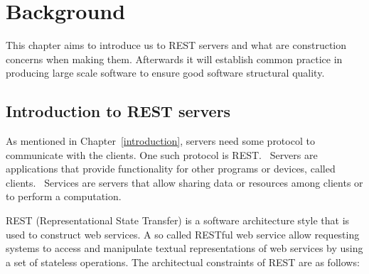 \chapter{Background}\label{background}

This chapter aims to introduce us to REST servers and what are construction
concerns when making them. Afterwards it will establish common practice in
producing large scale software to ensure good software structural quality.

\section{Introduction to REST servers}

As mentioned in Chapter~\ref{introduction}, servers need some protocol to
communicate with the clients. One such protocol is
REST.~\cite{Fielding:2000:ASD:932295} Servers are applications that provide
functionality for other programs or devices, called
clients.~\cite{Fielding:2000:ASD:932295} Services are servers that allow sharing
data or resources among clients or to perform a computation.

REST (Representational State Transfer) is a software architecture style that is
used to construct web services. A so called RESTful web service allow requesting
systems to access and manipulate textual representations of web services by
using a set of stateless operations. The architectual constraints of REST are as
follows:


